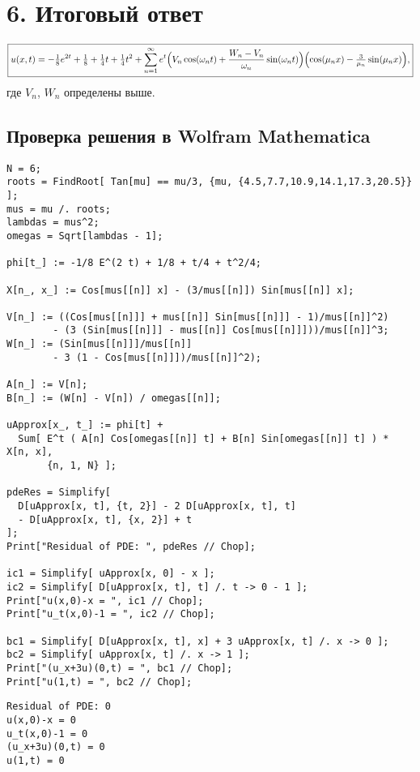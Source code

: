 \documentclass[a4paper,12pt]{article}
\begin{document}
\medskip
\section*{6. Итоговый ответ}

\[
\boxed{
u(x,t)
= -\tfrac{1}{8}e^{2t} + \tfrac{1}{8} + \tfrac{1}{4}t + \tfrac{1}{4}t^2
+ \sum_{n=1}^\infty
e^{t}\Bigl(
V_n\cos(\omega_n t)
+ \frac{W_n - V_n}{\omega_n}\sin(\omega_n t)
\Bigr)
\Bigl(
\cos(\mu_n x) - \tfrac{3}{\mu_n}\sin(\mu_n x)
\Bigr),
}
\]
где \(V_n\), \(W_n\) определены выше.

\subsection*{Проверка решения в Wolfram Mathematica}
\begin{lstlisting}[style=wolfram]
N = 6;                           
roots = FindRoot[ Tan[mu] == mu/3, {mu, {4.5,7.7,10.9,14.1,17.3,20.5}} ];
mus = mu /. roots;
lambdas = mus^2;
omegas = Sqrt[lambdas - 1];

phi[t_] := -1/8 E^(2 t) + 1/8 + t/4 + t^2/4;

X[n_, x_] := Cos[mus[[n]] x] - (3/mus[[n]]) Sin[mus[[n]] x];

V[n_] := ((Cos[mus[[n]]] + mus[[n]] Sin[mus[[n]]] - 1)/mus[[n]]^2)
        - (3 (Sin[mus[[n]]] - mus[[n]] Cos[mus[[n]]]))/mus[[n]]^3;
W[n_] := (Sin[mus[[n]]]/mus[[n]] 
        - 3 (1 - Cos[mus[[n]]])/mus[[n]]^2);

A[n_] := V[n];
B[n_] := (W[n] - V[n]) / omegas[[n]];

uApprox[x_, t_] := phi[t] + 
  Sum[ E^t ( A[n] Cos[omegas[[n]] t] + B[n] Sin[omegas[[n]] t] ) * X[n, x],
       {n, 1, N} ];

pdeRes = Simplify[
  D[uApprox[x, t], {t, 2}] - 2 D[uApprox[x, t], t]
  - D[uApprox[x, t], {x, 2}] + t
];
Print["Residual of PDE: ", pdeRes // Chop];

ic1 = Simplify[ uApprox[x, 0] - x ];
ic2 = Simplify[ D[uApprox[x, t], t] /. t -> 0 - 1 ];
Print["u(x,0)-x = ", ic1 // Chop];
Print["u_t(x,0)-1 = ", ic2 // Chop];

bc1 = Simplify[ D[uApprox[x, t], x] + 3 uApprox[x, t] /. x -> 0 ];
bc2 = Simplify[ uApprox[x, t] /. x -> 1 ];
Print["(u_x+3u)(0,t) = ", bc1 // Chop];
Print["u(1,t) = ", bc2 // Chop];
\end{lstlisting}

\begin{tcolorbox}[
  colback=wolframbox,
  colframe=gray,
  title=Результаты выполнения,
  boxrule=0.5pt,
  left=2mm,right=2mm,top=1mm,bottom=1mm,
  fontupper=\small\ttfamily
]
\begin{verbatim}
Residual of PDE: 0
u(x,0)-x = 0
u_t(x,0)-1 = 0
(u_x+3u)(0,t) = 0
u(1,t) = 0
\end{verbatim}
\end{tcolorbox}
\end{document}
